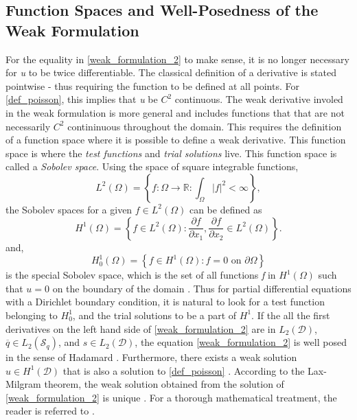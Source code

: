 \subsection{Function Spaces and Well-Posedness of the Weak Formulation} 
For the equality in \eqref{weak_formulation_2} to make sense, it is no longer necessary for \emph{u} to be twice differentiable. The classical definition of a derivative
 is stated pointwise - thus requiring the function to be defined at all points. For \eqref{def_poisson}, this implies that \emph{u} be $C^{2}$ continuous. The weak derivative involed in the weak formulation is more general and includes functions that
 that are not necessarily $C^{2}$ contininuous throughout the domain. This requires the definition of a function space where it is possible to define a weak derivative.
 This function space is where the \emph{test functions} and \emph{trial solutions} live. This function space is called a \emph{Sobolev space}. 
 Using the space of square integrable functions,
 \begin{equation} \label{square_integrable_space}
    L^{2}(\Omega) = \left\{f: \Omega \to \mathbb{R} : \int_{\Omega} |f|^{2} < \infty \right\},
 \end{equation} 
 the Sobolev spaces for a given $f \in L^{2}(\Omega)$ can be defined as
\begin{equation}\label{sobolev_space}
    H^{1}(\Omega) = \left\{f \in L^{2}(\Omega): \frac{\partial f}{\partial x_{1}}, \frac{\partial f}{\partial x_{2}} \in L^{2}(\Omega)\right\}.
\end{equation}
and,
\begin{equation} \label{hilbert_space}
    H^{1}_{0}(\Omega) = \left\{f \in H^{1}(\Omega): f = 0 \text{ on } \partial \Omega\right\}
\end{equation}
is the special Sobolev space, which is the set of all functions \emph{f} in $H^{1}(\Omega)$ such that $u = 0$ on the boundary of the domain \cite{suli2012}.
 Thus for partial differential equations with a Dirichlet boundary condition, it is natural to look for a test function belonging to $H^{1}_{0}$, 
 and the trial solutions to be a part of $H^{1}$.
If the all the first derivatives on the left hand side of \eqref{weak_formulation_2} are in $L_{2}(\mathcal{D})$,
 $\overline{q} \in L_{2}(\mathcal{S}_{q})$, and $s \in L_{2}(\mathcal{D})$, the equation \eqref{weak_formulation_2} is well posed in the sense of Hadamard \cite{suli2012}.
 Furthermore, there exists a weak solution $u \in H^{1}(\mathcal{D})$ that is also a solution to \eqref{def_poisson} \cite{brenner2002}. 
 According to the Lax-Milgram theorem, the weak solution obtained from the solution of \eqref{weak_formulation_2} is unique \cite{larcher2013}.
 For a thorough mathematical treatment, the reader is referred to \cite{brenner2002}.  
%
%
